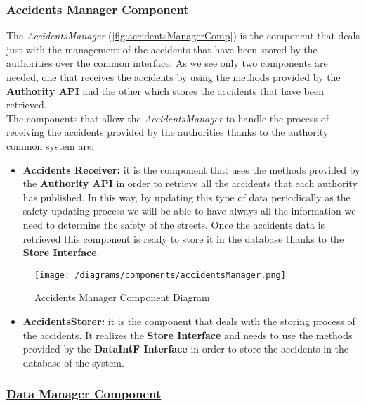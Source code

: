 		\subsubsection[Accidents Manager Component]{\hyperlink{toc}{Accidents Manager Component}}
			\label{sec:accidentsManagerComponent}
			
			The \emph{AccidentsManager} (\autoref{fig:accidentsManagerComp}) is the component that deals just with the management of the accidents that have been stored by the authorities over the common interface. As we see only two components are needed, one that receives the accidents by using the methods provided by the \textbf{Authority API} and the other which stores the accidents that have been retrieved.\\
			
			The components that allow the \emph{AccidentsManager} to handle the process of receiving the accidents provided by the authorities thanks to the authority common system are:
			
			\begin{itemize}
				\item \textbf{Accidents Receiver:} it is the component that uses the methods provided by the \textbf{Authority API} in order to retrieve all the accidents that each authority has published. In this way, by updating this type of data periodically as the safety updating process we will be able to have always all the information we need to determine the safety of the streets. Once the accidents data is retrieved this component is ready to store it in the database thanks to the \textbf{Store Interface}.
			\end{itemize}
			
			\begin{figure}[ht]
				\centering
				\texttt{[image: /diagrams/components/accidentsManager.png]}
				\caption{\label{fig:accidentsManagerComp} Accidents Manager Component Diagram}
			\end{figure}
		
			\begin{itemize}
				\item \textbf{AccidentsStorer:} it is the component that deals with the storing process of the accidents. It realizes the \textbf{Store Interface} and needs to use the methods provided by the \textbf{DataIntF Interface} in order to store the accidents in the database of the system.
			\end{itemize}
		
		\subsubsection[Data Manager Component]{\hyperlink{toc}{Data Manager Component}}
			\label{sec:dataManagerComponent}
			
